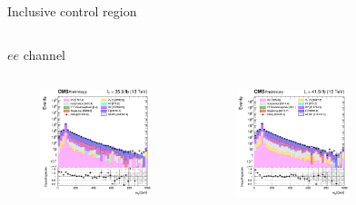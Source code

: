 \documentclass[8pt]{beamer}
\begin{document}
\begin{frame}{Inclusive control region}
\begin{columns}
\begin{column}{1.09\textwidth}
\begin{block}{\centering $ee$ channel}\end{block}
\end{column}
\end{columns} \vspace{-5pt}
\begin{columns}
		\begin{column}{0.33\textwidth}
			\begin{center}
			\vspace{-8pt}
			\begin{block}{}\end{block}\vspace{10pt}
     			\includegraphics[width=1.0\textwidth, height=90pt]{figs/2016/log_cratio_inclusiveCR_ee_mll.png}
    		\end{center}		
		\end{column} 
		\begin{column}{0.33\textwidth}
			\begin{center}
			\vspace{-8pt}
			\begin{block}{}\end{block}\vspace{10pt}
     			\includegraphics[width=1.0\textwidth, height=90pt]{figs/2017/log_cratio_inclusiveCR_ee_mll.png}
    		\end{center}		
		\end{column} 
		\begin{column}{0.33\textwidth}
			\begin{center}
			\vspace{-8pt}

\end{center}
\end{column}
\end{columns}
\end{frame}
\end{document}
